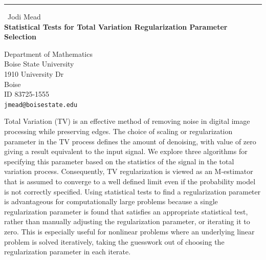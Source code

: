 \documentclass{report}
\begin{document}
\begin{center}
\rule{6in}{1pt} \
{\large Jodi Mead \\
{\bf Statistical Tests for Total Variation Regularization Parameter Selection}}

Department of Mathematics \\ Boise State University \\ 1910 University Dr \\ Boise \\ ID 83725-1555
\\
{\tt jmead@boisestate.edu}\end{center}

Total Variation (TV) is an effective method of removing noise in digital
image processing while preserving edges. The choice of scaling or
regularization parameter in the TV process defines the amount of
denoising, with value of zero giving a result equivalent to the input
signal. We explore three algorithms for specifying this parameter based
on the statistics of the signal in the total variation process.
Consequently, TV regularization is viewed as an M-estimator that is
assumed to converge to a well defined limit even if the probability model
is not correctly specified. Using statistical tests to find a
regularization parameter is advantageous for computationally large
problems because a single regularization parameter is found that
satisfies an appropriate statistical test, rather than manually adjusting
the regularization parameter, or iterating it to zero. This is especially
useful for nonlinear problems where an underlying linear problem is
solved iteratively, taking the guesswork out of choosing the
regularization parameter in each iterate.
\end{document}
